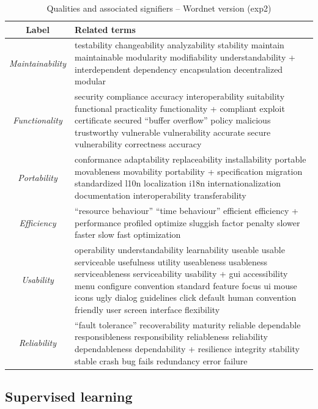 \documentclass{acm_proc_article-sp}
\begin{document}
\begin{table}[h]
	\caption{Qualities and associated signifiers – Wordnet version (\textsf{exp2})}
	\centering
	\label{tbl:wnsig}
\begin{tabular}{c|p{9cm}}
\toprule
\textbf{Label} & \textbf{Related terms} \\
\midrule
\emph{Maintainability} &
testability changeability analyzability stability maintain maintainable modularity modifiability understandability + interdependent dependency encapsulation decentralized modular\\ \hline
\emph{Functionality} &
security compliance accuracy interoperability suitability functional practicality functionality + compliant exploit certificate secured “buffer overflow” policy malicious trustworthy vulnerable vulnerability accurate secure vulnerability correctness accuracy\\ \hline
\emph{Portability} &
conformance adaptability replaceability installability portable movableness movability portability + specification migration standardized l10n localization i18n internationalization documentation interoperability transferability\\ \hline
\emph{Efficiency} &
“resource behaviour” “time behaviour” efficient efficiency + performance profiled optimize sluggish factor penalty slower faster slow fast optimization\\ \hline
\emph{Usability} &
operability understandability learnability useable usable serviceable usefulness utility useableness usableness serviceableness serviceability usability + gui accessibility menu configure convention standard feature focus ui mouse icons ugly dialog guidelines click default human convention friendly user screen interface flexibility\\ \hline
\emph{Reliability} &
“fault tolerance” recoverability maturity reliable dependable responsibleness responsibility reliableness reliability dependableness dependability + resilience integrity stability stable crash bug fails redundancy error failure\\ 
\bottomrule
\end{tabular}
\end{table}

\subsection{Supervised learning}
\end{document}
